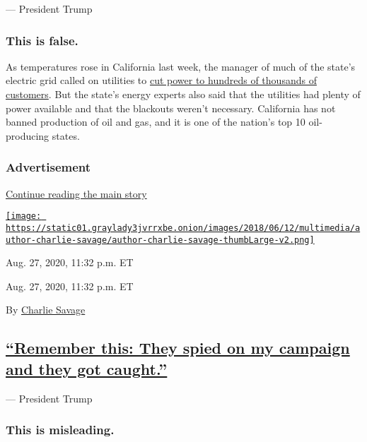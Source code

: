 --- President Trump

\hypertarget{this-is-false}{%
\subsubsection{This is false.}\label{this-is-false}}

As temperatures rose in California last week, the manager of much of the
state's electric grid called on utilities to
\href{https://slack-redir.net/link?url=https\%3A\%2F\%2Fwww.nytimes3xbfgragh.onion\%2F2020\%2F08\%2F16\%2Fbusiness\%2Fcalifornia-blackouts.html}{cut
power to hundreds of thousands of customers}. But the state's energy
experts also said that the utilities had plenty of power available and
that the blackouts weren't necessary. California has not banned
production of oil and gas, and it is one of the nation's top 10
oil-producing states.

\hypertarget{advertisement-1}{%
\subsubsection{Advertisement}\label{advertisement-1}}

\protect\hyperlink{after-dfp-ad-mid2}{Continue reading the main story}

\href{https://www.nytimes3xbfgragh.onion/by/charlie-savage}{\texttt{[image: https://static01.graylady3jvrrxbe.onion/images/2018/06/12/multimedia/author-charlie-savage/author-charlie-savage-thumbLarge-v2.png]}}

Aug. 27, 2020, 11:32 p.m. ET

Aug. 27, 2020, 11:32 p.m. ET

By \href{https://www.nytimes3xbfgragh.onion/by/charlie-savage}{Charlie
Savage}

\hypertarget{remember-this-they-spied-on-my-campaign-and-they-got-caught}{%
\subsection{\texorpdfstring{\protect\hyperlink{remember-this-they-spied-on-my-campaign-and-they-got-caught}{``Remember
this: They spied on my campaign and they got
caught.''}}{``Remember this: They spied on my campaign and they got caught.''}}\label{remember-this-they-spied-on-my-campaign-and-they-got-caught}}

--- President Trump

\hypertarget{this-is-misleading--1}{%
\subsubsection{\texorpdfstring{\textbf{This is misleading.}
}{This is misleading. }}\label{this-is-misleading--1}}

